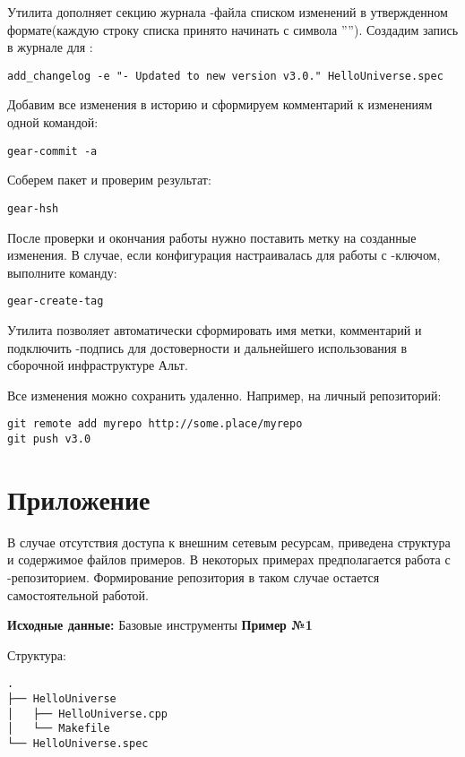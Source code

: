 Утилита  дополняет секцию журнала -файла
списком изменений в утвержденном формате(каждую строку списка принято начинать
с символа ''\Sys{-}''). Создадим запись в журнале для :
\begin{verbatim}
add_changelog -e "- Updated to new version v3.0." HelloUniverse.spec
\end{verbatim}

Добавим все изменения в историю  и сформируем комментарий к изменениям
одной командой:
\begin{verbatim}
gear-commit -a
\end{verbatim}

Соберем пакет и проверим результат:
\begin{verbatim}
gear-hsh
\end{verbatim}

После проверки и окончания работы нужно поставить метку на созданные изменения.
В случае, если конфигурация  настраивалась для работы с -ключом,
выполните команду:
\begin{verbatim}
gear-create-tag
\end{verbatim}
Утилита  позволяет автоматически сформировать имя метки, комментарий
и подключить -подпись для достоверности и дальнейшего использования в
сборочной инфраструктуре Альт.

Все изменения можно сохранить удаленно. Например, на личный репозиторий:
\begin{verbatim}
git remote add myrepo http://some.place/myrepo
git push v3.0
\end{verbatim}

\section{Приложение}
В случае отсутствия доступа к внешним сетевым ресурсам, приведена структура
и содержимое файлов примеров. В некоторых примерах предполагается работа с
-репозиторием. Формирование репозитория в таком случае остается
самостоятельной работой.

\textbf{Исходные данные:} Базовые инструменты  \textbf{Пример №1}

\noindent Структура:
\begin{verbatim}
.
├── HelloUniverse
│   ├── HelloUniverse.cpp
│   └── Makefile
└── HelloUniverse.spec

\end{verbatim}

